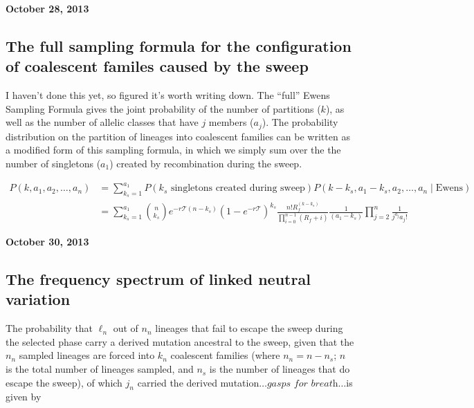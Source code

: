 \documentclass[reqno]{amsart}
\begin{document}
\begin{flushright}
	\textbf{October 28, 2013}
\end{flushright}

\subsection*{The full sampling formula for the configuration of coalescent familes caused by the sweep}

I haven't done this yet, so figured it's worth writing down. The ``full'' Ewens Sampling Formula gives the joint probability of the number of partitions ($k$), as well as the number of allelic classes that have $j$ members ($a_j$). The probability distribution on the partition of lineages into coalescent families can be written as a modified form of this sampling formula, in which we simply sum over the the number of singletons ($a_1$) created by recombination during the sweep.

\begin{align}
	P(k,a_1,a_2,\dots,a_n) &= \sum_{k_s = 1}^{a_1}P(k_s\text{ singletons created during sweep})P(k-k_s,a_1-k_s,a_2,\dots,a_n\mid \text{Ewens}) \\
	&= \sum_{k_s=1}^{a_1}\binom{n}{k_s}e^{-r\mathcal{T}(n-k_s)}(1-e^{-r\mathcal{T}})^{k_s}\frac{n!R_f^{(k-k_s)}}{\prod_{i=0}^{n-1}(R_f+i)} \frac{1}{(a_1-k_s)}\prod_{j=2}^{n}\frac{1}{j^{a_j}a_j!}
\end{align}

\begin{flushright}
	\textbf{October 30, 2013}
\end{flushright}
\subsection*{The frequency spectrum of linked neutral variation}

The probability that $\ell_n$ out of $n_n$ lineages that fail to escape the sweep during the selected phase carry a derived mutation ancestral to the sweep, given that the $n_n$ sampled lineages are forced into $k_n$ coalescent families (where $n_n = n - n_s$; $n$ is the total number of lineages sampled, and $n_s$ is the number of lineages that do escape the sweep), of which $j_n$ carried the derived mutation$\dots\textit{gasps for breath}\dots$is given by
\end{document}
